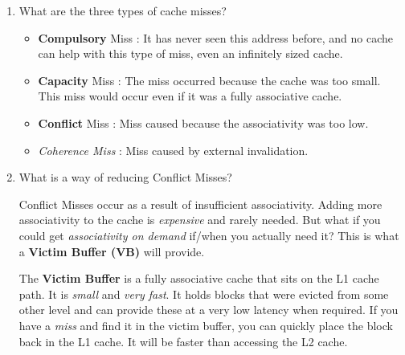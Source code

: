 \documentclass[12pt]{article}
\newenvironment{QandA}{\begin{enumerate}[label=\bfseries\arabic*.]\bfseries}
                      {\end{enumerate}}
\newenvironment{answered}{\par\quad\normalfont}{}
\begin{document}
\begin{QandA}
\begin{answered}
\textit{Q: A LOAD instruction during a \textbf{read miss} can't go on without the data so it must stall, but does a STORE instruction during a \textbf{write miss} need to stall?}

\quad No, we can actually keep going. And to do this, we require another hardware structure called the \textbf{Store Buffer}. STORE instructions put addresses / values into the store buffer and keep going. The caveat is that \textbf{LOAD} instructions must now also check the \textit{Store Buffer} in addition to Data Memory. 
\end{answered}

\ 

\item What are the three types of cache misses?
\begin{answered}
\vspace{-0.85cm}
\begin{itemize}
    \item \textbf{Compulsory} Miss : It has never seen this address before, and no cache can help with this type of miss, even an infinitely sized cache.
    \item \textbf{Capacity} Miss : The miss occurred because the cache was too small. This miss would occur even if it was a fully associative cache.
    \item \textbf{Conflict} Miss : Miss caused because the associativity was too low. 
    \item \textit{Coherence Miss} : Miss caused by external invalidation.
\end{itemize}
\end{answered}

\item What is a way of reducing Conflict Misses?
\begin{answered}
Conflict Misses occur as a result of insufficient associativity. Adding more associativity to the cache is \textit{expensive} and rarely needed. But what if you could get \textit{associativity on demand} if/when you actually need it? This is what a \textbf{Victim Buffer (VB)} will provide.

\quad The \textbf{Victim Buffer} is a fully associative cache that sits on the L1 cache path. It is \textit{small} and \textit{very fast}. It holds blocks that were evicted from some other level and can provide these at a very low latency when required. If you have a \textit{miss} and find it in the victim buffer, you can quickly place the block back in the L1 cache. It will be faster than accessing the L2 cache. 
\end{answered}


\end{QandA}
\end{document}
